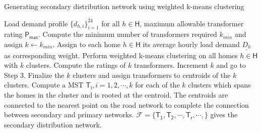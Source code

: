 \documentclass[11pt,letterpaper]{article}
\begin{document}
\begin{algorithm}
	\caption{Generating secondary distribution network using weighted k-means clustering}
	\label{alg:2}
	\begin{algorithmic}[1]
		\REQUIRE Load demand profile $\{d_{h,i}\}_{i=1}^{24}$ for all $h\in\mathsf{H}$, maximum allowable transformer rating $\mathsf{P_{max}}$.
		\STATE Compute the minimum number of transformers required $k_{min}$ and assign $k\leftarrow k_{min}$.
		\STATE Assign to each home $h\in\mathsf{H}$ its average hourly load demand $\underline{D_h}$ as corresponding weight.
		\STATE Perform weighted k-means clustering on all homes $h\in\mathsf{H}$ with $k$ clusters.
		\STATE Compute the ratings of $k$ transformers.
		\STATE Increment $k$ and go to Step 3.
		\ENDIF
		\STATE Finalize the $k$ clusters and assign transformers to centroids of the $k$ clusters.
		\STATE Compute a MST $\mathsf{T_i}, i=1,2,\cdots,k$ for each of the $k$ clusters which spans the homes in the cluster and is rooted at the centroid.
		\STATE The centroids are connected to the nearest point on the road network to complete the connection between secondary and primary networks.
		\STATE $\mathcal{F}=\{\mathsf{T_1},\mathsf{T_2},\cdots,\mathsf{T_r},\cdots,\}$ gives the secondary distribution network.
	\end{algorithmic}
\end{algorithm}
\end{document}
